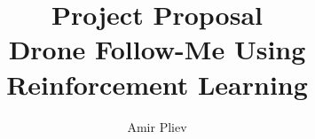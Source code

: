 \documentclass[11pt]{article}
\begin{document}
    
        
    \title{Project Proposal \large \\Drone Follow-Me Using Reinforcement Learning}
    \author{Amir Pliev}


    

    \tableofcontents
    \newpage
    \restoregeometry

    \begin{multicols}{2}
            

        

        

        

        


        
        
        

    \end{multicols}
\end{document}
